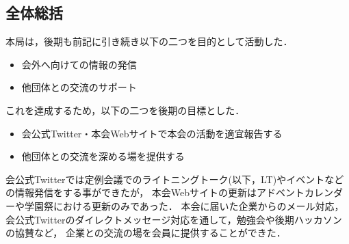 \subsection*{全体総括}


本局は，後期も前記に引き続き以下の二つを目的として活動した．
\begin{itemize}
	\item 会外へ向けての情報の発信
	\item 他団体との交流のサポート
\end{itemize}
これを達成するため，以下の二つを後期の目標とした．
\begin{itemize}
	\item 会公式Twitter・本会Webサイトで本会の活動を適宜報告する
	\item 他団体との交流を深める場を提供する
\end{itemize}

会公式Twitterでは定例会議でのライトニングトーク(以下，LT)やイベントなどの情報発信をする事ができたが，
本会Webサイトの更新はアドベントカレンダーや学園祭における更新のみであった．
本会に届いた企業からのメール対応，会公式Twitterのダイレクトメッセージ対応を通して，勉強会や後期ハッカソンの協賛など，
企業との交流の場を会員に提供することができた．
